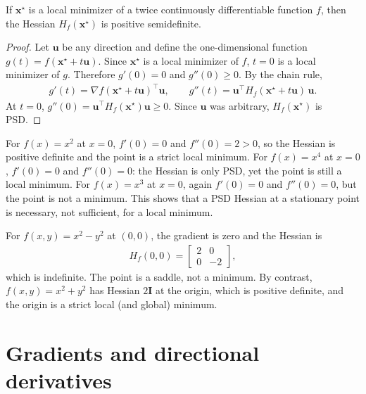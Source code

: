\documentclass[a4paper, 12pt]{book}
\begin{document}
\begin{theorem}
    If $\mathbf{x}^\star$ is a local minimizer of a twice continuously differentiable
    function $f$, then the Hessian $H_f(\mathbf{x}^\star)$ is positive semidefinite.
\end{theorem}
\begin{proof}
    Let $\mathbf{u}$ be any direction and define the one-dimensional function
    $g(t) = f(\mathbf{x}^\star + t\mathbf{u})$. Since $\mathbf{x}^\star$ is a local
    minimizer of $f$, $t=0$ is a local minimizer of $g$. Therefore
    $g'(0)=0$ and $g''(0)\geq 0$. By the chain rule,
    \begin{align}
        g'(t) = \nabla f(\mathbf{x}^\star+t\mathbf{u})^\top\mathbf{u},
        \qquad
        g''(t) = \mathbf{u}^\top H_f(\mathbf{x}^\star+t\mathbf{u})\,\mathbf{u}.
    \end{align}
    At $t=0$, $g''(0)=\mathbf{u}^\top H_f(\mathbf{x}^\star)\mathbf{u}\geq 0$. Since
    $\mathbf{u}$ was arbitrary, $H_f(\mathbf{x}^\star)$ is PSD.
\end{proof}

\begin{example}
    For $f(x)=x^2$ at $x=0$, $f'(0)=0$ and $f''(0)=2>0$, so the Hessian is positive
    definite and the point is a strict local minimum. For $f(x)=x^4$ at $x=0$,
    $f'(0)=0$ and $f''(0)=0$: the Hessian is only PSD, yet the point is still a local
    minimum. For $f(x)=x^3$ at $x=0$, again $f'(0)=0$ and $f''(0)=0$, but the point is
    not a minimum. This shows that a PSD Hessian at a stationary point is necessary,
    not sufficient, for a local minimum.
\end{example}

\begin{example}
    For $f(x,y)=x^2-y^2$ at $(0,0)$, the gradient is zero and the Hessian is
    \begin{align}
        H_f(0,0) = \begin{bmatrix}2&0\\0&-2\end{bmatrix},
    \end{align}
    which is indefinite. The point is a saddle, not a minimum. By contrast,
    $f(x,y)=x^2+y^2$ has Hessian $2\mathbf{I}$ at the origin, which is positive
    definite, and the origin is a strict local (and global) minimum.
\end{example}


\section{Gradients and directional derivatives}
\end{document}
